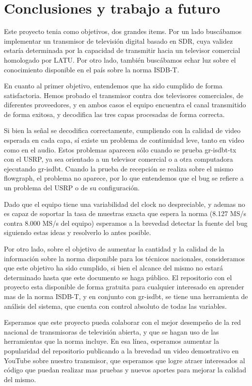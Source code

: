 \chapter{Conclusiones y trabajo a futuro}

Este proyecto tenia como objetivos, dos grandes items. Por un lado buscábamos implementar un transmisor de televisión digital basado en SDR, cuya validez estaría determinada por la capacidad de transmitir hacia un televisor comercial homologado por LATU. Por otro lado, también buscábamos echar luz sobre el conocimiento disponible en el país sobre la norma ISDB-T. 

En cuanto al primer objetivo, entendemos que ha sido cumplido de forma satisfactoria. Hemos probado el transmisor contra dos televisores comerciales, de diferentes proveedores, y en ambos casos el equipo encuentra el canal transmitido de forma exitosa, y decodifica las tres capas procesadas de forma correcta. 

Si bien la señal se decodifica correctamente, cumpliendo con la calidad de video esperada en cada capa, sí existe un problema de continuidad leve, tanto en video como en el audio. Estos problemas aparecen sólo cuando se prueba gr-isdbt-tx con el USRP, ya sea orientado a un televisor comercial o a otra computadora ejecutando gr-isdbt. Cuando la prueba de recepción se realiza sobre el mismo flowgraph, el problema no aparece, por lo que entendemos que el bug se refiere a un problema del USRP o de su configuración.

Dado que el equipo tiene una variabilidad del clock no despreciable, y ademas no es capaz de soportar la tasa de muestras exacta que espera la norma (8.127 MS/s contra 8.000 MS/s del equipo) esperamos a la brevedad detectar la fuente del bug siguiendo estas ideas y resolverlo lo antes posible.

Por otro lado, sobre el objetivo de aumentar la cantidad y la calidad de la información sobre la norma disponible para los técnicos nacionales, consideramos que este objetivo ha sido cumplido, si bien el alcance del mismo no estará determinado hasta que este documento se haga público. El repositorio con el proyecto esta disponible de forma gratuita para cualquier interesado en aprender mas de la norma ISDB-T, y en conjunto con gr-isdbt, se tiene una herramienta de análisis del sistema, que cuenta con control absoluto de todas las variables. 

Esperamos que este proyecto pueda colaborar con el mejor desempeño de la red nacional de transmisoras de televisión abierta, y que se hagan uso de las herramientas que la norma incluye. En esa línea, esperamos aumentar la popularidad del repositorio publicando a la brevedad un video demostrativo en YouTube sobre nuestro transmisor, que esperamos que logre atraer interesados al código que puedan realizar mas pruebas y nuevos aportes para mejorar la calidad del mismo.

